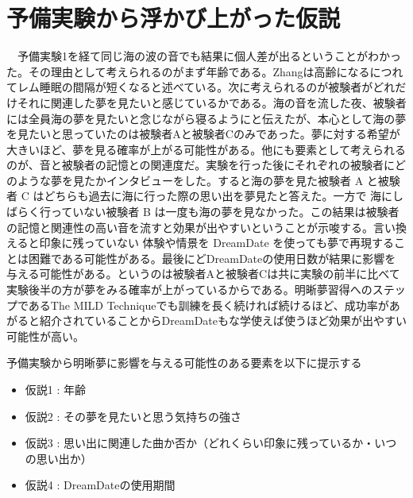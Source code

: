 \section{予備実験から浮かび上がった仮説}
　予備実験1を経て同じ海の波の音でも結果に個人差が出るということがわかった。その理由として考えられるのがまず年齢である。Zhangは高齢になるにつれてレム睡眠の間隔が短くなると述べている\cite{Zhang}。次に考えられるのが被験者がどれだけそれに関連した夢を見たいと感じているかである。海の音を流した夜、被験者には全員海の夢を見たいと念じながら寝るようにと伝えたが、本心として海の夢を見たいと思っていたのは被験者Aと被験者Cのみであった。夢に対する希望が大きいほど、夢を見る確率が上がる可能性がある。他にも要素として考えられるのが、音と被験者の記憶との関連度だ。実験を行った後にそれぞれの被験者にどのような夢を見たかインタビューをした。すると海の夢を見た被験者 A と被験者 C はどちらも過去に海に行った際の思い出を夢見たと答えた。一方で 海にしばらく行っていない被験者 B は一度も海の夢を見なかった。この結果は被験者の記憶と関連性の高い音を流すと効果が出やすいということが示唆する。言い換えると印象に残っていない 体験や情景を DreamDate を使っても夢で再現することは困難である可能性がある。最後にどDreamDateの使用日数が結果に影響を与える可能性がある。というのは被験者Aと被験者Cは共に実験の前半に比べて実験後半の方が夢をみる確率が上がっているからである。明晰夢習得へのステップであるThe MILD Techniqueでも訓練を長く続ければ続けるほど、成功率があがると紹介されていることからDreamDateもな学使えば使うほど効果が出やすい可能性が高い\cite{LaBerge}。

予備実験から明晰夢に影響を与える可能性のある要素を以下に提示する
\begin{itemize}
\item 仮説1 : 年齢
\item 仮説2 : その夢を見たいと思う気持ちの強さ
\item 仮説3 : 思い出に関連した曲か否か（どれくらい印象に残っているか・いつの思い出か）
\item 仮説4 : DreamDateの使用期間
\end{itemize}

